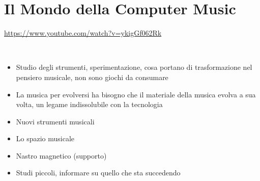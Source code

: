 
\section{Il Mondo della Computer Music}

\url{https://www.youtube.com/watch?v=ykigGf062Rk}

~\vfill

\begin{itemize}
\item Studio degli strumenti, sperimentazione, cosa portano di trasformazione nel pensiero musicale, non sono giochi da consumare
\item La musica per evolversi ha bisogno che il materiale della musica evolva a sua volta, un legame indissolubile con la tecnologia
\item Nuovi strumenti musicali
\item Lo spazio musicale
\item Nastro magnetico (supporto)
\item Studi piccoli, informare su quello che sta succedendo
\end{itemize}

\clearpage
